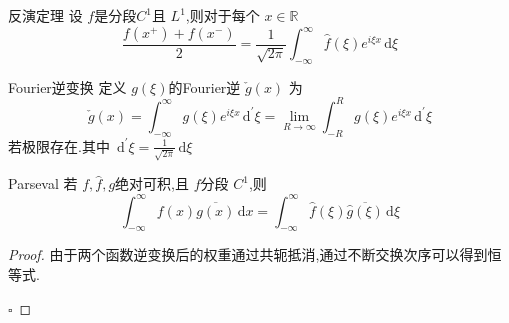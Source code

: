 \documentclass[../../PDE.tex]{subfiles}
\begin{document}
\begin{theorem}{反演定理}
    设 \(  f  \)是分段\(  C^{1}  \)且 \(  L^{1}  \),则对于每个 \(  x \in \mathbb{R}   \) \[
    \frac{f\left( x^{+ } \right)+ f\left( x^{-} \right)   }{2 }= \frac{1 }{\sqrt{2\pi } }\int_{-\infty}^{\infty}\hat{f}\left(  \xi  \right)e^{i \xi x}\,\mathrm{d}  \xi    
    \]     
\end{theorem}

\begin{definition}{Fourier逆变换}
    定义 \(  g\left(  \xi  \right)   \)的Fourier逆 \( \check{g}\left( x \right)    \)  为 \[
    \check{g}\left( x \right)= \int_{-\infty}^{\infty}g\left(  \xi  \right)e^{i \xi x}\,\mathrm{d} ^{\prime}  \xi = \lim_{R\to \infty}\int_{-R}^{R}g\left(  \xi  \right)e^{i \xi x}\,\mathrm{d} ^{\prime}  \xi    
    \]若极限存在.其中 \(  \,\mathrm{d} ^{\prime}  \xi   = \frac{1 }{\sqrt{2\pi } }\,\mathrm{d}  \xi  \) 
\end{definition}


\begin{theorem}{Parseval}
    若 \(  f,\hat{f},g  \)绝对可积,且 \(  f  \)分段 \(  C^{1}  \),则    \[
    \int_{-\infty}^{\infty}f\left( x \right) \overline{g\left( x \right) }\,\mathrm{d} x =  \int_{-\infty}^{\infty} \hat{f}\left(  \xi  \right)  \overline{\hat{g}\left(  \xi  \right) }\,\mathrm{d}  \xi  
    \]
\end{theorem}
\begin{proof}
    由于两个函数逆变换后的权重通过共轭抵消,通过不断交换次序可以得到恒等式.

    \hfill $\square$
\end{proof}
\end{document}
